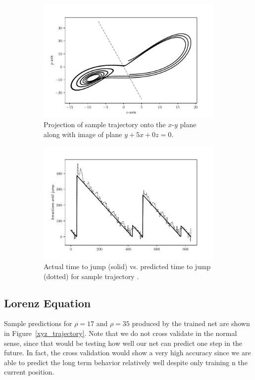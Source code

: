 \documentclass[10pt]{article}
\begin{document}
\begin{figure}[bt!]\centering
\begin{subfigure}{.45\textwidth}\centering
\includegraphics[width=\textwidth]{img/separating_hyerplane.pdf}
\caption{Projection of sample trajectory onto the \( x \)-\( y \) plane along with image of plane \( y + 5x +0z = 0 \).}
\label{separating_hyperplane}
\end{subfigure}\hfill
\begin{subfigure}{.45\textwidth}\centering
\includegraphics[width=\textwidth]{img/jump_predictor.pdf}
\caption{Actual time to jump (solid) vs. predicted time to jump (dotted) for sample trajectory .}
\label{jump_predictor}
\end{subfigure}
\caption{}
\end{figure}

\subsection{Lorenz Equation}
Sample predictions for \( \rho = 17 \) and \( \rho = 35 \) produced by the trained net are shown in Figure~\ref{xyz_trajectory}. Note that we do not cross validate in the normal sense, since that would be testing how well our net can predict one step in the future. In fact, the cross validation would show a very high accuracy since we are able to predict the long term behavior relatively well despite only training n the current position.
\end{document}
